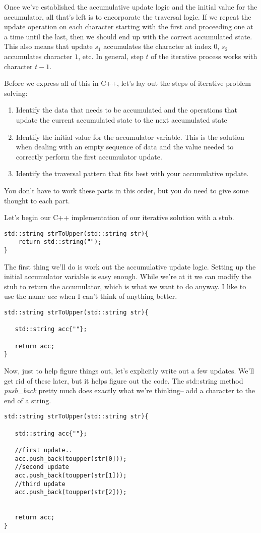 \documentclass[]{tufte-handout}
\begin{document}
Once we've established the accumulative update logic and the initial value for the accumulator, all that's left is to encorporate the traversal logic. If we repeat the update operation on each character starting with the first and proceeding one at a time until the last, then we should end up with the correct accumulated state. This also means that update $s_1$ accumulates the character at index $0$, $s_2$ accumulates character $1$, etc. In general, step $t$ of the iterative process works with character $t-1$.


Before we express all of this in C++, let's lay out the steps of iterative problem solving:
\begin{enumerate}
\item Identify the data that needs to be accumulated and the operations that update the current accumulated state to the next accumulated state
\item Identify the initial value for the accumulator variable. This is the solution when dealing with an empty sequence of data and the value needed to correctly perform the first accumulator update.
\item Identify the traversal pattern that fits best with your accumulative update.  
\end{enumerate}
You don't have to work these parts in this order, but you do need to give some thought to each part.  

Let's begin our C++ implementation of our iterative solution with a stub.
\begin{verbatim}
std::string strToUpper(std::string str){
	return std::string("");
}
\end{verbatim}

The first thing we'll do is work out the accumulative update logic.  Setting up the initial accumulator variable is easy enough. While we're at it we can modify the stub to return the accumulator, which is what we want to do anyway.  I like to use the name \textit{acc} when I can't think of anything better.  
\begin{verbatim}
std::string strToUpper(std::string str){
   
   std::string acc{""};   
   
   return acc;
}
\end{verbatim}

Now, just to help figure things out, let's explicitly write out a few updates.  We'll get rid of these later, but it helps figure out the code.  The std::string method \textit{push\_back} pretty much does exactly what we're thinking-- add a character to the end of a string.
\begin{verbatim}
std::string strToUpper(std::string str){
   
   std::string acc{""};   
   
   //first update..
   acc.push_back(toupper(str[0]));
   //second update
   acc.push_back(toupper(str[1]));
   //third update
   acc.push_back(toupper(str[2]));
  
   
   return acc;
}
\end{verbatim}
\end{document}
